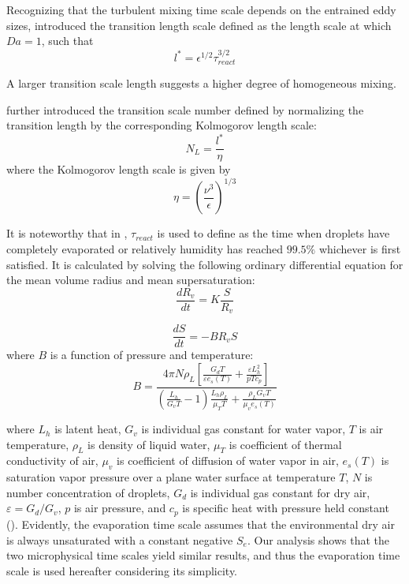 \documentclass[draft,jgrga]{AGUTeX}
\begin{document}
\begin{article}
Recognizing that the turbulent mixing time scale depends on the entrained eddy sizes, \cite{Lehmann2009} introduced the transition length scale defined as the length scale at which $Da = 1$, such that
\begin{equation}
l^{*}=\epsilon^{1/2}\tau_{react}^{3/2}
\end{equation}

A larger transition scale length suggests a higher degree of homogeneous mixing.
 
\cite{Lu2011} further introduced the transition scale number defined by normalizing the transition length by the corresponding Kolmogorov length scale:
\begin{equation}
N_{L}=\frac{l^{*}}{\eta}\label{eq:NL}
\end{equation}
where the Kolmogorov length scale is given by
\begin{equation}
\eta = (\frac{\nu^3}{\epsilon})^{1/3}
\end{equation}

It is noteworthy that in \cite{Lehmann2009, Lu2013}, $\tau_{react}$ is used to define as the time when droplets have completely 
evaporated or relatively humidity has reached $99.5\%$ whichever is first satisfied. It is calculated 
by solving the following ordinary differential equation for the mean volume radius and mean supersaturation:
\begin{equation}
\frac{dR_{v}}{dt}=K\frac{S}{R_{v}}\label{eq:DiffR}
\end{equation}

\begin{equation}
\frac{dS}{dt}=-BR_{v}S\label{eq:DiffSuper}
\end{equation}
where $B$ is a function of pressure and temperature:
\begin{equation}
B = 
\frac{4\pi N\rho_L[\frac{G_dT}{\varepsilon e_s(T)} + \frac{\varepsilon L^2_h}{pTc_p}]} 
{(\frac{L_h}{G_vT}-1)\frac{L_h\rho_L}{\mu_T T} + \frac{\rho_L G_v T}{\mu_v e_s(T)}}
\end{equation}

where $L_h$ is latent heat, $G_v$ is individual gas constant for water vapor,
$T$ is air temperature, $\rho_L$ is density of liquid water, $\mu_T$ is coefficient
of thermal conductivity of air, $\mu_v$ is coefficient of diffusion of water vapor
in air, $e_s(T)$ is saturation vapor pressure over a plane water surface at
temperature $T$, $N$ is number concentration of droplets, $G_d$ is individual
gas constant for dry air, $\varepsilon = G_d/G_v$, $p$ is air pressure, and
$c_p$ is specific heat with pressure held constant (\cite{Lu2011}).
Evidently, the evaporation time scale assumes that the environmental dry air is always unsaturated with a constant negative $S_e$. Our analysis shows that the two microphysical time scales yield similar results, and thus the evaporation time scale is used hereafter considering its simplicity.
 

\end{article}
\end{document}

